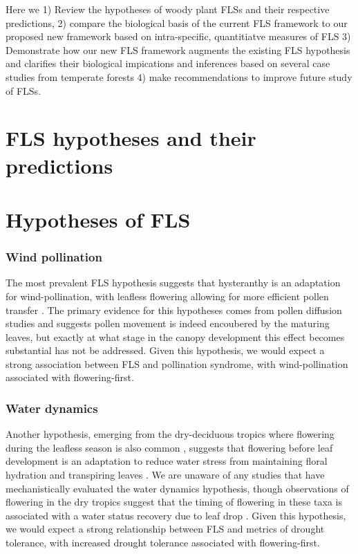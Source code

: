 \documentclass{article}
\begin{document}
 Here we 1) Review the hypotheses of woody plant FLSs and their respective predictions, 2) compare the biological basis of the current FLS framework to our proposed new framework based on intra-specific, quantitiatve measures of FLS 3)  Demonstrate how our new FLS framework augments the existing FLS hypothesis and clarifies their biological impications and inferences based on several case studies from temperate forests 4) make recommendations to improve future study of FLSs. 
\section*{FLS hypotheses and their predictions}
\section*{Hypotheses of FLS}
\subsubsection*{ Wind pollination}
\indent\indent The most prevalent FLS hypothesis suggests that hysteranthy is an adaptation for wind-pollination, with leafless flowering allowing for more efficient pollen transfer \citep{Whitehead1969, Spurr1980,Friedman2009}. The primary evidence for this hypotheses comes from pollen diffusion studies \citep[e.g., particle movement through closed and open canopies][]{Niklas1985,Nathan2005, Milleron2012} and suggests pollen movement is indeed encoubered by the maturing leaves, but exactly at what stage in the canopy development this effect becomes substantial has not be addressed. Given this hypothesis, we would expect a strong association between FLS and pollination syndrome, with wind-pollination associated with flowering-first.

\subsubsection*{Water dynamics}
\indent\indent Another hypothesis, emerging from the dry-deciduous tropics where flowering during the leafless season is also common \citep{Janzen1967}, suggests that flowering before leaf development is an adaptation to reduce water stress from maintaining floral hydration and transpiring leaves \citep{Franklin2016}. We are unaware of any studies that have mechanistically evaluated the water dynamics hypothesis, though observations of flowering in the dry tropics suggest that the timing of flowering in these taxa is associated with a water status recovery due to leaf drop \citep{Borchert1983,Reich1984}. Given this hypothesis, we would expect a strong relationship between FLS and metrics of drought tolerance, with increased drought tolerance associated with flowering-first.\\ %
\end{document}
